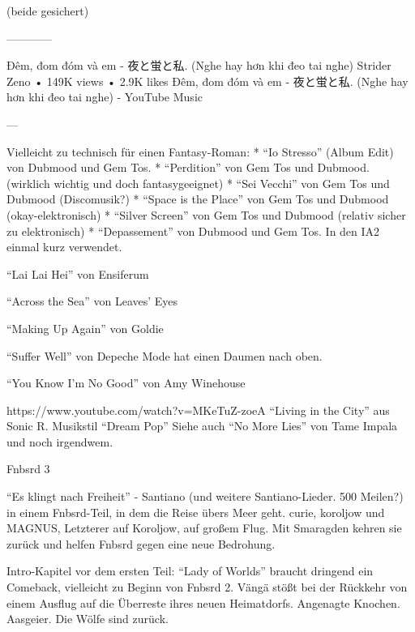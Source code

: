 (beide gesichert)


—---------




Đêm, đom đóm và em - 夜と蛍と私. (Nghe hay hơn khi đeo tai nghe)
Strider Zeno
• 149K views • 2.9K likes
Đêm, đom đóm và em - 夜と蛍と私. (Nghe hay hơn khi đeo tai nghe) - YouTube Music




—


















Vielleicht zu technisch für einen Fantasy-Roman:
* “Io Stresso” (Album Edit) von Dubmood und Gem Tos.
* “Perdition” von Gem Tos und Dubmood. (wirklich wichtig und doch fantasygeeignet)
* “Sei Vecchi” von Gem Tos und Dubmood (Discomusik?)
* “Space is the Place” von Gem Tos und Dubmood (okay-elektronisch)
* “Silver Screen” von Gem Tos und Dubmood (relativ sicher zu elektronisch)
* “Depassement” von Dubmood und Gem Tos. In den IA2 einmal kurz verwendet.


“Lai Lai Hei” von Ensiferum


“Across the Sea” von Leaves’ Eyes


“Making Up Again” von Goldie


“Suffer Well” von Depeche Mode hat einen Daumen nach oben.


“You Know I'm No Good” von Amy Winehouse




https://www.youtube.com/watch?v=MKeTuZ-zoeA
“Living in the City” aus Sonic R.
Musikstil “Dream Pop”
Siehe auch “No More Lies” von Tame Impala und noch irgendwem.


Fnbsrd 3


“Es klingt nach Freiheit” - Santiano
(und weitere Santiano-Lieder. 500 Meilen?)
in einem Fnbsrd-Teil, in dem die Reise übers Meer geht.
curie, koroljow und MAGNUS, Letzterer auf Koroljow, auf großem Flug.
Mit Smaragden kehren sie zurück und helfen Fnbsrd gegen eine neue Bedrohung.








Intro-Kapitel vor dem ersten Teil: “Lady of Worlds” braucht dringend ein Comeback, vielleicht zu Beginn von Fnbsrd 2. Vängä stößt bei der Rückkehr von einem Ausflug auf die Überreste ihres neuen Heimatdorfs. Angenagte Knochen. Aasgeier. Die Wölfe sind zurück.


